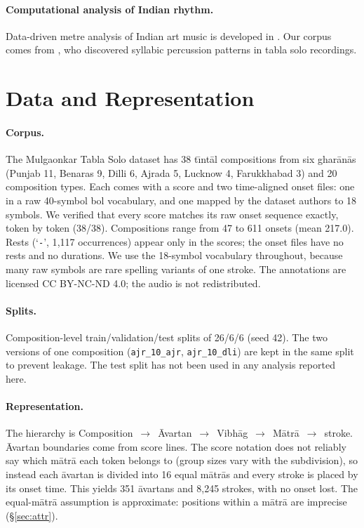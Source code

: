 \documentclass[11pt]{article}
\newcommand{\matra}{m\=atr\=a}
\newcommand{\Matra}{M\=atr\=a}
\newcommand{\avartan}{\=avartan}
\newcommand{\Vibhag}{Vibh\=ag}
\newcommand{\Avartan}{\=Avartan}
\newcommand{\gharana}{ghar\=an\=a}
\begin{document}
\paragraph{Computational analysis of Indian rhythm.} Data-driven metre
analysis of Indian art music is developed in \citet{srinivasamurthy2016data}.
Our corpus comes from \citet{gupta2015discovery}, who discovered syllabic
percussion patterns in tabla solo recordings.

\section{Data and Representation}
\label{sec:data}

\paragraph{Corpus.} The Mulgaonkar Tabla Solo dataset \citep{gupta2015discovery}
has 38 t\={\i}nt\=al compositions from six \gharana{}s (Punjab 11, Benaras 9, Dilli
6, Ajrada 5, Lucknow 4, Farukkhabad 3) and 20 composition types. Each comes
with a score and two time-aligned onset files: one in a raw 40-symbol bol
vocabulary, and one mapped by the dataset authors to 18 symbols. We
verified that every score matches its raw onset sequence exactly, token by
token (38/38). Compositions range from 47 to 611 onsets (mean 217.0).
Rests (`\texttt{-}', 1{,}117 occurrences) appear only in the scores; the onset
files have no rests and no durations. We use the 18-symbol vocabulary
throughout, because many raw symbols are rare spelling variants of one stroke.
The annotations are licensed CC BY-NC-ND 4.0; the audio is not redistributed.

\paragraph{Splits.} Composition-level train/validation/test splits of 26/6/6
(seed 42). The two versions of one composition (\texttt{ajr\_10\_ajr},
\texttt{ajr\_10\_dli}) are kept in the same split to prevent leakage. The
test split has not been used in any analysis reported here.

\paragraph{Representation.} The hierarchy is
Composition~$\to$~\Avartan~$\to$~\Vibhag~$\to$~\Matra~$\to$~stroke.
\Avartan{} boundaries come from score lines. The score notation does not
reliably say which \matra{} each token belongs to (group sizes vary with the
subdivision), so instead each \avartan{} is divided into 16 equal \matra{}s
and every stroke is placed by its onset time. This yields 351 \avartan{}s
and 8{,}245 strokes, with no onset lost. The equal-\matra{} assumption is
approximate: positions within a \matra{} are imprecise (\S\ref{sec:attr}).
\end{document}
